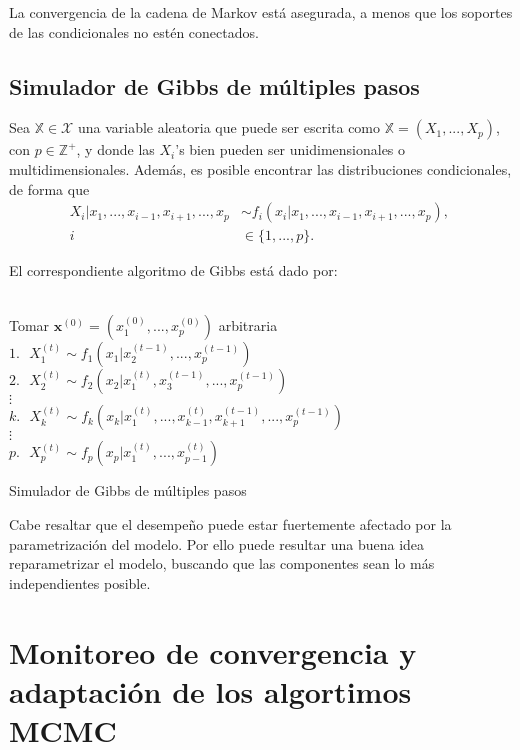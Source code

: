 La convergencia de la cadena de Markov está asegurada, a menos que los soportes de las condicionales no estén conectados.

\subsection{Simulador de Gibbs de múltiples pasos}

Sea $\mathbb{X} \in \mathcal{X}$ una variable aleatoria que puede ser escrita como $\mathbb{X} = (X_1,...,X_p)$, con $p \in \mathbb{Z}^+$, y donde las $X_i$'s bien pueden ser unidimensionales o multidimensionales. Además, es posible encontrar las distribuciones condicionales, de forma que
\begin{equation*}
\begin{aligned}
X_i|x_1,...,x_{i-1},x_{i+1},...,x_p &\sim f_i(x_i|x_1,...,x_{i-1},x_{i+1},...,x_p) \text{, }\\
i &\in \{1,...,p\}.
\end{aligned}
\end{equation*}

El correspondiente algoritmo de Gibbs está dado por:
\\ \\
\begin{algorithm}[H]
 Tomar $\textbf{x}^{(0)} = (x_1^{(0)},...,x_p^{(0)})$ arbitraria\;
 {
    $1. \text{ } X_1^{(t)} \sim f_1(x_1|x_2^{(t-1)},...,x_p^{(t-1)})\;$\\
    $2. \text{ } X_2^{(t)} \sim f_2(x_2|x_1^{(t)},x_3^{(t-1)},...,x_p^{(t-1)})\;$\\
    $\vdots \;$\\
    $k.  \text{ } X_k^{(t)} \sim f_k(x_k|x_1^{(t)},...,x_{k-1}^{(t)},x_{k+1}^{(t-1)},...,x_p^{(t-1)})\;$\\
    $\vdots\;$\\
    $p.  \text{ }X_p^{(t)} \sim f_p(x_p|x_1^{(t)},...,x_{p-1}^{(t)})\;$\\
 }
 \caption{Simulador de Gibbs de múltiples pasos}
\end{algorithm}
\BlankLine

Cabe resaltar que el desempeño puede estar fuertemente afectado por la parametrización del modelo. Por ello puede resultar una buena idea reparametrizar el modelo, buscando que las componentes sean lo más independientes posible.

\section {Monitoreo de convergencia y adaptación de los algortimos MCMC}

